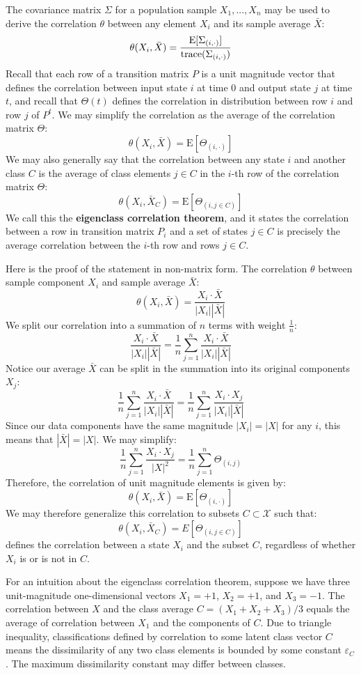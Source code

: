 \documentclass[10pt, a5paper, twoside, openright]{memoir}
\begin{document}
The covariance matrix $\Sigma$ for a population sample $X_1,...,X_n$ may be used to derive the correlation $\theta$ between any element $X_i$ and its sample average $\bar X$:
$$\theta(X_i, \bar X) = \frac{\mathrm{E}[\Sigma_{(i, \cdot)}]}{\textnormal{trace}(\Sigma_{(i, \cdot)})}$$
Recall that each row of a transition matrix $P$ is a unit magnitude vector that defines the correlation between input state $i$ at time $0$ and output state $j$ at time $t$, and recall that $\Theta(t)$ defines the correlation in distribution between row $i$ and row $j$ of $P^t$. We may simplify the correlation as the average of the correlation matrix $\Theta$:
$$\theta(X_i, \bar X) = \mathrm{E}[\Theta_{(i, \cdot)}]$$
We may also generally say that the correlation between any state $i$ and another class $C$ is the average of class elements $j \in C$ in the $i$-th row of the correlation matrix $\Theta$:
$$\theta(X_i, \bar X_C) = \mathrm{E}[\Theta_{(i, j \in C)}]$$
We call this the \textbf{eigenclass correlation theorem}, and it states the correlation between a row in transition matrix $P_i$ and a set of states $j \in C$ is precisely the average correlation between the $i$-th row and rows $j \in C$. 

Here is the proof of the statement in non-matrix form. The correlation $\theta$ between sample component $X_i$ and sample average $\bar X$:
$$\theta (X_i, \bar X) = \frac{X_i \cdot \bar X}{|X_i| |\bar X|}$$
We split our correlation into a summation of $n$ terms with weight $\frac{1}{n}$:
$$ \frac{X_i \cdot \bar X}{|X_i| |\bar X|}  = \frac{1}{n} \sum\limits_{j=1}^n \frac{X_i \cdot \bar X}{|X_i| |\bar X|}$$
Notice our average $\bar X$ can be split in the summation into its original components $X_j$:
$$\frac{1}{n} \sum\limits_{j=1}^n \frac{X_i \cdot \bar X}{|X_i| |\bar X|} = \frac{1}{n} \sum\limits_{j=1}^n \frac{X_i \cdot X_j}{|X_i| |\bar X|}$$
Since our data components have the same magnitude $|X_i| = |X|$ for any $i$, this means that $|\bar X| = |X|$. We may simplify:
$$\frac{1}{n} \sum\limits_{j=1}^n \frac{X_i \cdot X_j}{|X|^2} = \frac{1}{n} \sum\limits_{j=1}^n \Theta_{(i, j)}$$
Therefore, the correlation of unit magnitude elements is given by:
$$\theta (X_i, \bar X) = \mathrm{E}[\Theta_{(i, \cdot)}]$$
We may therefore generalize this correlation to subsets $C \subset \mathcal X$ such that:
$$\theta(X_i, \bar X_C) = E[\Theta_{(i, j \in C)}]$$
defines the correlation between a state $X_i$ and the subset $C$, regardless of whether $X_i$ is or is not in $C$.

For an intuition about the eigenclass correlation theorem, suppose we have three unit-magnitude one-dimensional vectors $X_1 = +1$, $X_2 = +1$, and $X_3 = -1$. The correlation between $X$ and the class average $C = (X_1 + X_2 + X_3) / 3$ equals the average of correlation between $X_1$ and the components of $C$. Due to triangle inequality, classifications defined by correlation to some latent class vector $C$ means the dissimilarity of any two class elements is bounded by some constant $\varepsilon_C$. The maximum dissimilarity constant may differ between classes.
\end{document}
